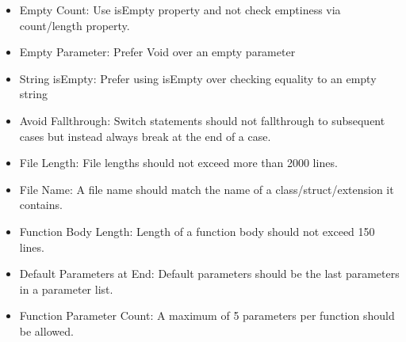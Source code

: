 \documentclass[12pt]{article}
\begin{document}
\begin{itemize}
     \newline
  \item Empty Count:\newline
    Use isEmpty property and not check emptiness via count/length property. \newline
     \newline
  \item Empty Parameter:\newline
    Prefer Void over an empty parameter \newline
     \newline
  \item String isEmpty:\newline
    Prefer using isEmpty over checking equality to an empty string \newline
     \newline
  \item Avoid Fallthrough:\newline
    Switch statements should not fallthrough to subsequent cases but instead always break at the end of  \newline
    a case. \newline
     \newline
  \item File Length:\newline
    File lengths should not exceed more than 2000 lines. \newline
     \newline
  \item File Name:\newline
    A file name should match the name of a class/struct/extension it contains. \newline
     \newline
  \item Function Body Length:\newline
    Length of a function body should not exceed 150 lines. \newline
     \newline
  \item Default Parameters at End:\newline
    Default parameters should be the last parameters in a parameter list. \newline
     \newline
  \item Function Parameter Count:\newline
    A maximum of 5 parameters per function should be allowed. \newline

\end{itemize}
\end{document}
